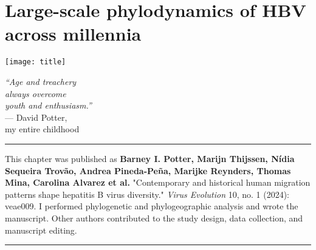 \chapter{Large-scale phylodynamics of HBV across millennia}\label{ch:chapter3}

\begin{minipage}[b]{0.6\textwidth}
    \texttt{[image: title]} %
  \end{minipage}
  \hfill
  \begin{minipage}[b]{0.35\textwidth}
    \footnotesize
    \begin{flushright}
      \textit{``Age and treachery\\always overcome\\youth and enthusiasm.''} \\
      --- David Potter, \\my entire childhood
    \end{flushright}
    \vspace{2cm}
  \end{minipage}

\clearpage


\singlespacing

\hrule
\vspace*{12pt}
This chapter was published as \textbf{Barney I. Potter, Marijn Thijssen, Nídia Sequeira Trovão, Andrea Pineda-Peña, Marijke Reynders, Thomas Mina, Carolina Alvarez et al.} "Contemporary and historical human migration patterns shape hepatitis B virus diversity." \textit{Virus Evolution} 10, no. 1 (2024): veae009.
I performed phylogenetic and phylogeographic analysis and wrote the manuscript.
Other authors contributed to the study design, data collection, and manuscript editing.
\vspace*{12pt}
\hrule

\onehalfspacing

